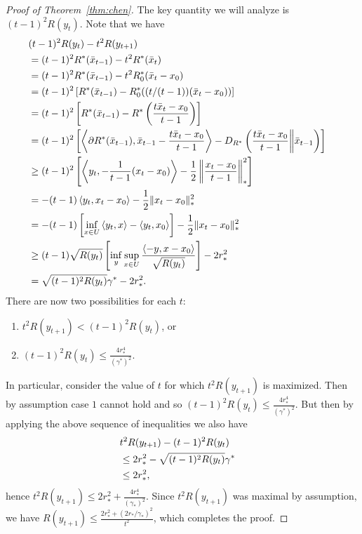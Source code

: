 \documentclass[paper.tex]{subfiles}
\begin{document}
\begin{proof}[Proof of Theorem~\ref{thm:chen}]
The key quantity we will analyze is $(t-1)^2R(y_t)$. Note that we have
\begin{align*}
\lefteqn{(t-1)^2R(y_t) - t^2R(y_{t+1})} \\
 &= (t-1)^2R^*(\bar{x}_{t-1})-t^2R^*(\bar{x}_t) \\
 &= (t-1)^2R^*(\bar{x}_{t-1})-t^2R_0^*(\bar{x}_t-x_{0}) \\
 &= (t-1)^2\left[R^*(\bar{x}_{t-1})-R_0^*((t/(t-1))(\bar{x}_t-x_{0}))\right] \\
 &= (t-1)^2\left[R^*(\bar{x}_{t-1})-R^*\left(\frac{t\bar{x}_t-x_{0}}{t-1}\right)\right] \\
 &= (t-1)^2\left[\ip{\partial R^*(\bar{x}_{t-1})}{\bar{x}_{t-1}-\frac{t\bar{x}_t-x_{0}}{t-1}}-D_{R^*}\left(\frac{t\bar{x}_t-x_{0}}{t-1} \middle\| \bar{x}_{t-1}\right)\right] \\
 &\geq (t-1)^2\left[\ip{y_t}{-\frac{1}{t-1}(x_t-x_{0})}-\frac{1}{2}\left\|\frac{x_t-x_{0}}{t-1}\right\|_*^2\right] \\
 &= -(t-1)\ip{y_t}{x_t-x_{0}}-\frac{1}{2}\|x_t-x_{0}\|_*^2 \\
 &= -(t-1)\left[\inf_{x \in U} \ip{y_t}{x} - \ip{y_t}{x_{0}}\right]-\frac{1}{2}\|x_t-x_{0}\|_*^2 \\
 &\geq (t-1)\sqrt{R(y_t)}\left[\inf_{y} \sup_{x \in U} \frac{\ip{-y}{x-x_0}}{\sqrt{R(y_t)}}\right]-2r_*^2 \\
 &= \sqrt{(t-1)^2R(y_t)}\gamma^*-2r_*^2.
\end{align*}
There are now two possibilities for each $t$:
\begin{enumerate}
\item $t^2R(y_{t+1}) < (t-1)^2R(y_t)$, or
\item $(t-1)^2R(y_t) \leq \frac{4r_*^4}{(\gamma^*)^2}$.
\end{enumerate}
In particular, consider the value of $t$ for which 
$t^2R(y_{t+1})$ is maximized. Then by assumption 
case $1$ cannot hold and so $(t-1)^2R(y_t) \leq \frac{4r_*^4}{(\gamma^*)^2}$.
But then by applying the above sequence of inequalities 
we also have 
\begin{align*}
\lefteqn{t^2R(y_{t+1}) - (t-1)^2R(y_t)} \\
 &\leq 2r_*^2 - \sqrt{(t-1)^2R(y_t)}\gamma^* \\
 &\leq 2r_*^2,
\end{align*}
hence $t^2R(y_{t+1}) \leq 2r_*^2 + \frac{4r_*^4}{(\gamma_*)^2}$. 
Since $t^2R(y_{t+1})$ was maximal by assumption, we have
$R(y_{t+1}) \leq \frac{2r_*^2+(2r_*/\gamma_*)^2}{t^2}$, which 
completes the proof.
\end{proof}
\end{document}
